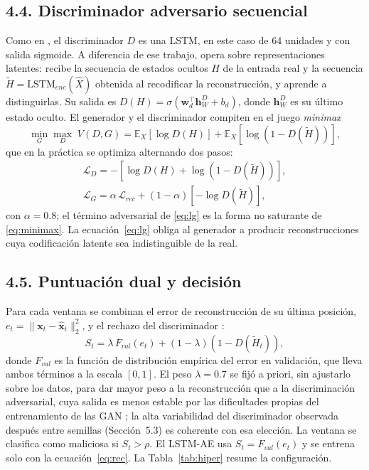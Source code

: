 \documentclass[jou,a4paper,floatsintext,donotrepeattitle]{apa7}
\newcommand{\vect}[1]{\mathbf{#1}}
\begin{document}
\subsection{4.4. Discriminador adversario secuencial}
Como en \textcite{niu2020}, el discriminador $D$ es una LSTM, en este caso de 64 unidades y con salida sigmoide. A diferencia de ese trabajo, opera sobre representaciones latentes: recibe la secuencia de estados ocultos $H$ de la entrada real y la secuencia $\tilde H = \mathrm{LSTM}_{enc}(\hat X)$ obtenida al recodificar la reconstrucción, y aprende a distinguirlas. Su salida es $D(H) = \sigma(\vect{w}_d^{\top}\vect{h}^{D}_{W} + b_d)$, donde $\vect{h}^{D}_{W}$ es su último estado oculto. El generador y el discriminador compiten en el juego \textit{minimax}
\begin{equation}
\min_{G}\max_{D}\; V(D,G) = \mathbb{E}_{X}\!\left[\log D(H)\right] + \mathbb{E}_{X}\!\left[\log\!\left(1 - D(\tilde H)\right)\right],
\label{eq:minimax}
\end{equation}
que en la práctica se optimiza alternando dos pasos:
\begin{gather}
\mathcal{L}_{D} = -\left[\log D(H) + \log\!\left(1 - D(\tilde H)\right)\right], \label{eq:ld}\\
\mathcal{L}_{G} = \alpha\,\mathcal{L}_{rec} + (1-\alpha)\left[-\log D(\tilde H)\right], \label{eq:lg}
\end{gather}
con $\alpha = 0.8$; el término adversarial de \eqref{eq:lg} es la forma no saturante de \eqref{eq:minimax}. La ecuación~\eqref{eq:lg} obliga al generador a producir reconstrucciones cuya codificación latente sea indistinguible de la real.

\subsection{4.5. Puntuación dual y decisión}
Para cada ventana se combinan el error de reconstrucción de su última posición, $e_t = \lVert \vect{x}_t - \hat{\vect{x}}_t \rVert_2^2$, y el rechazo del discriminador \parencite{qian2025}:
\begin{equation}
S_t = \lambda\,F_{val}(e_t) + (1-\lambda)\left(1 - D(\tilde H_t)\right),
\label{eq:score}
\end{equation}
donde $F_{val}$ es la función de distribución empírica del error en validación, que lleva ambos términos a la escala $[0,1]$. El peso $\lambda = 0.7$ se fijó a priori, sin ajustarlo sobre los datos, para dar mayor peso a la reconstrucción que a la discriminación adversarial, cuya salida es menos estable por las dificultades propias del entrenamiento de las GAN \parencite{qian2025}; la alta variabilidad del discriminador observada después entre semillas (Sección~5.3) es coherente con esa elección. La ventana se clasifica como maliciosa si $S_t > \rho$. El LSTM-AE usa $S_t = F_{val}(e_t)$ y se entrena solo con la ecuación~\eqref{eq:rec}. La Tabla~\ref{tab:hiper} resume la configuración.
\end{document}
